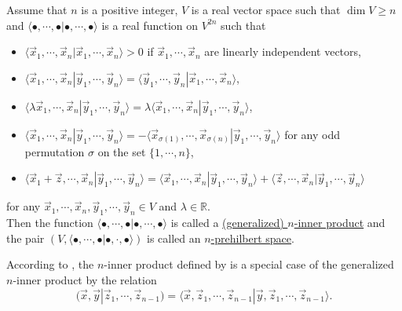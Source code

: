 \documentclass[
  letterpaper,
  DIV=11,
  numbers=noendperiod]{scrreprt}
\begin{document}
\begin{Definition}[mydefinition=Generalized $n$-Inner Product Space \cite{trencevski2006}, label=def:trencevskimalceski]
Assume that $n$ is a positive integer, $V$ is a real vector space such that $\dim V \geq n$ and $\langle \bullet, \cdots, \bullet | \bullet, \cdots, \bullet \rangle$ is a real function on $V^{2n}$ such that

\begin{itemize}
    \item $\langle \vec{x}_1, \cdots, \vec{x}_n | \vec{x}_1, \cdots, \vec{x}_n \rangle > 0$ if $\vec{x}_1, \cdots, \vec{x}_n$ are linearly independent vectors,
    \item $\langle \vec{x}_1, \cdots, \vec{x}_n | \vec{y}_1, \cdots, \vec{y}_n \rangle = \langle \vec{y}_1, \cdots, \vec{y}_n | \vec{x}_1, \cdots, \vec{x}_n \rangle$,
    \item $\langle \lambda \vec{x}_1, \cdots, \vec{x}_n | \vec{y}_1, \cdots, \vec{y}_n \rangle = \lambda \langle \vec{x}_1, \cdots, \vec{x}_n | \vec{y}_1, \cdots, \vec{y}_n \rangle$,
    \item $\langle \vec{x}_1, \cdots, \vec{x}_n | \vec{y}_1, \cdots, \vec{y}_n \rangle = -\langle  \vec{x}_{\sigma (1)}, \cdots, \vec{x}_{\sigma (n)} | \vec{y}_1, \cdots, \vec{y}_n \rangle$ for any odd permutation $\sigma$ on the set $\{1, \cdots, n \}$,
    \item $\langle \vec{x}_1 + \vec{z}, \cdots, \vec{x}_n | \vec{y}_1, \cdots, \vec{y}_n \rangle = \langle \vec{x}_1, \cdots, \vec{x}_n | \vec{y}_1, \cdots, \vec{y}_n \rangle + \langle \vec{z}, \cdots, \vec{x}_n | \vec{y}_1, \cdots, \vec{y}_n \rangle$
\end{itemize}

for any $\vec{x}_1, \cdots, \vec{x}_n, \vec{y}_1, \cdots, \vec{y}_n \in V$ and $\lambda \in \mathbb{R}$.\\

Then the function $\langle \bullet, \cdots, \bullet | \bullet, \cdots, \bullet \rangle$ is called a \underline{(generalized) $n$-inner product} and the pair $(V, \langle \bullet, \cdots, \bullet | \bullet, \cdot, \bullet \rangle)$ is called an \underline{$n$-prehilbert space}.
\end{Definition}

According to \cite{trencevski2006}, the \(n\)-inner product defined by
\cite{Misiak1989} is a special case of the generalized \(n\)-inner
product by the relation
\[(\vec{x}, \vec{y} | \vec{z}_1, \cdots, \vec{z}_{n-1}) = \langle \vec{x}, \vec{z}_1, \cdots, \vec{z}_{n-1} | \vec{y}, \vec{z}_1, \cdots, \vec{z}_{n-1} \rangle.\]
\end{document}
